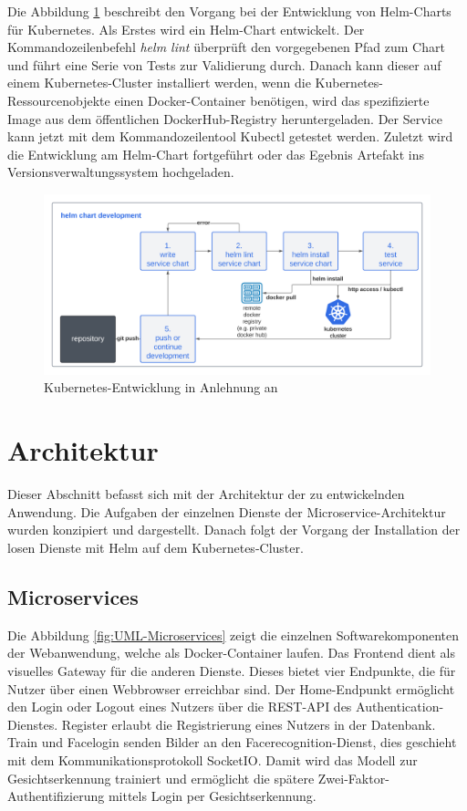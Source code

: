 Die Abbildung \ref{fig:DevWorkflowKubernetes} beschreibt den Vorgang bei der Entwicklung von Helm-Charts für Kubernetes.
Als Erstes wird ein Helm-Chart entwickelt.
Der Kommandozeilenbefehl \textit{helm lint} überprüft den vorgegebenen Pfad zum Chart und führt eine Serie von Tests zur Validierung durch.
Danach kann dieser auf einem Kubernetes-Cluster installiert werden, 
wenn die Kubernetes-Ressourcenobjekte einen Docker-Container benötigen,
wird das spezifizierte Image aus dem öffentlichen DockerHub-Registry heruntergeladen.
Der Service kann jetzt mit dem Kommandozeilentool Kubectl getestet werden.
Zuletzt wird die Entwicklung am Helm-Chart fortgeführt oder das Egebnis Artefakt ins Versionsverwaltungssystem hochgeladen.


\begin{figure}[!htb]
    \centering
    \includegraphics[width=1.0\columnwidth]{images/DevWorkflowKubernetes.png}
    \caption{Kubernetes-Entwicklung in Anlehnung an \cite{dockerappsworkflow}}
    \label{fig:DevWorkflowKubernetes}
\end{figure}


\newpage
\section{Architektur}
Dieser Abschnitt befasst sich mit der Architektur der zu entwickelnden Anwendung.
Die Aufgaben der einzelnen Dienste der Microservice-Architektur wurden konzipiert und dargestellt.
Danach folgt der Vorgang der Installation der losen Dienste mit Helm auf dem Kubernetes-Cluster.

\subsection{Microservices}

Die Abbildung \ref{fig:UML-Microservices} zeigt die einzelnen Softwarekomponenten der Webanwendung, welche als Docker-Container laufen.
Das Frontend dient als visuelles Gateway für die anderen Dienste.
Dieses bietet vier Endpunkte, die für Nutzer über einen Webbrowser erreichbar sind.
Der Home-Endpunkt ermöglicht den Login oder Logout eines Nutzers über die REST-API des Authentication-Dienstes.
Register erlaubt die Registrierung eines Nutzers in der Datenbank.
Train und Facelogin senden Bilder an den Facerecognition-Dienst, dies geschieht mit dem Kommunikationsprotokoll SocketIO.
Damit wird das Modell zur Gesichtserkennung trainiert und ermöglicht die spätere Zwei-Faktor-Authentifizierung mittels Login per Gesichtserkennung.


